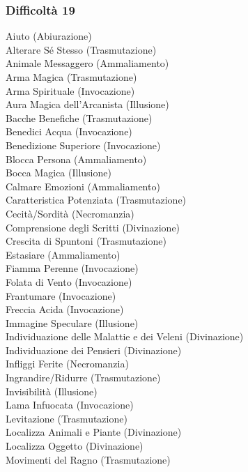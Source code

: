 \begin{multicols}{3}
	\subsubsection{Difficoltà 19}
	Aiuto (Abiurazione)\\
	Alterare Sé Stesso (Trasmutazione)\\
	Animale Messaggero (Ammaliamento)\\
	Arma Magica (Trasmutazione)\\
	Arma Spirituale (Invocazione)\\
	Aura Magica dell'Arcanista (Illusione)\\
	Bacche Benefiche (Trasmutazione)\\
	Benedici Acqua (Invocazione)\\
	Benedizione Superiore (Invocazione)\\
	Blocca Persona (Ammaliamento)\\
	Bocca Magica (Illusione)\\
	Calmare Emozioni (Ammaliamento)\\
	Caratteristica Potenziata (Trasmutazione)\\
	Cecità/Sordità (Necromanzia)\\
	Comprensione degli Scritti (Divinazione)\\
	Crescita di Spuntoni (Trasmutazione)\\
	Estasiare (Ammaliamento)\\
	Fiamma Perenne (Invocazione)\\
	Folata di Vento (Invocazione)\\
	Frantumare (Invocazione)\\
	Freccia Acida (Invocazione)\\
	Immagine Speculare (Illusione)\\
	Individuazione delle Malattie e dei Veleni (Divinazione)\\
	Individuazione dei Pensieri (Divinazione)\\
	Infliggi Ferite (Necromanzia)\\
	Ingrandire/Ridurre (Trasmutazione)\\
	Invisibilità (Illusione)\\
	Lama Infuocata (Invocazione)\\
	Levitazione (Trasmutazione)\\
	Localizza Animali e Piante (Divinazione)\\
	Localizza Oggetto (Divinazione)\\
	Movimenti del Ragno (Trasmutazione)\\

\end{multicols}
